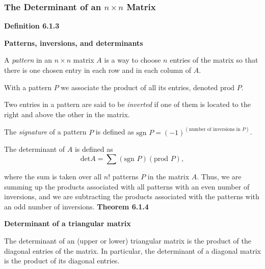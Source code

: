 \subsubsection*{The Determinant of an $n\times{}n$ Matrix}
\textbf{Definition 6.1.3}\\
\par\noindent\textbf{Patterns, inversions, and determinants}
\par\noindent A \textit{pattern} in an $n\times{}n$ matrix $A$ is a way to choose $n$ entries of the matrix so that there is one chosen entry in each row and in each column of $A$.
\par\noindent With a pattern $P$ we associate the product of all its entries, denoted $\textrm{prod }P$.
\par\noindent Two entries in a pattern are said to be \textit{inverted} if one of them is located to the right and above the other in the matrix.
\par\noindent The \textit{signature} of a pattern $P$ is defined as $\textrm{sgn }P=(-1)^{(\textrm{number of inversions in }P)}$.
\par\noindent The determinant of $A$ is defined as
\[\textrm{det}A=\sum{}(\textrm{sgn }P)(\textrm{prod }P),\]
\par\noindent where the sum is taken over all $n!$ patterns $P$ in the matrix $A$. Thus, we are summing up the products associated with all patterns with an even number of inversions, and we are subtracting the products associated with the patterns with an odd number of inversions.
\textbf{Theorem 6.1.4}\\
\par\noindent\textbf{Determinant of a triangular matrix}
\par\noindent The determinant of an (upper or lower) triangular matrix is the product of the diagonal entries of the matrix. In particular, the determinant of a diagonal matrix is the product of its diagonal entries.

